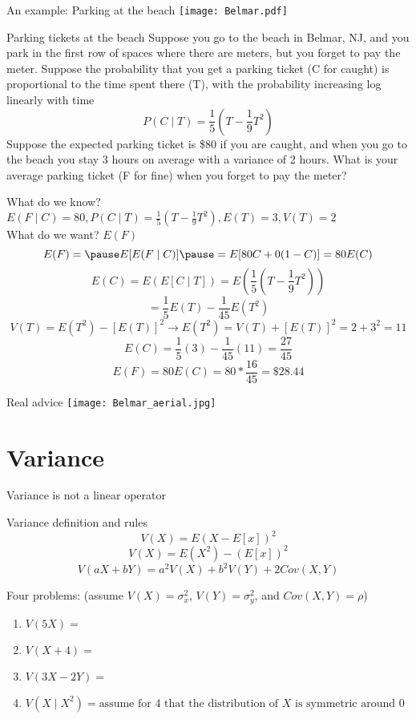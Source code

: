 \documentclass{beamer}
\begin{document}
\begin{frame}{An example: Parking at the beach}
\centering\texttt{[image: Belmar.pdf]}
\end{frame}

\begin{frame}{Parking tickets at the beach}
Suppose you go to the beach in Belmar, NJ, and you park in the first row of spaces where there are meters, but you forget to pay the meter. Suppose the probability that you get a parking ticket (C for caught) is proportional to the time spent there (T), with the probability increasing log linearly with time
$$P(C \mid T) = \frac{1}{5}\left(T-\frac{1}{9}T^2\right)$$
Suppose the expected parking ticket is \$80 if you are caught, and when you go to the beach you stay 3 hours on average with a variance of 2 hours. What is your average parking ticket (F for fine) when you forget to pay the meter?
\end{frame}

\begin{frame}
\alert{What do we know?} $E(F\mid C)=80, P(C\mid T)=\frac{1}{5}\left(T-\frac{1}{9}T^2\right), E(T)=3, V(T)=2$ \\
\alert{What do we want?} $E(F)$ \\
$$E(F) = \pause E[E(F\mid C)] \pause = E[80C + 0(1-C)] = 80E(C)$$
\pause
$$E(C)=E(E[C\mid T])=E\left(\frac{1}{5}\left (T-\frac{1}{9}T^2\right)\right)$$
\pause
$$=\frac{1}{5}E(T)-\frac{1}{45}E(T^2)$$
\pause
$$V(T)=E(T^2)-[E(T)]^2 \rightarrow E(T^2)=V(T)+[E(T)]^2=2+3^2=11$$
\pause
$$E(C)=\frac{1}{5}(3)-\frac{1}{45}(11)=\frac{27}{45}$$
\pause
$$E(F)=80E(C)=80*\frac{16}{45}=\$28.44$$
\end{frame}

\begin{frame}{Real advice}
\centering\texttt{[image: Belmar\_aerial.jpg]}
\end{frame}

\section{Variance}
\begin{frame}{Variance is not a linear operator}
\begin{block}{Variance definition and rules}
$$V(X)=E(X-E[x])^2$$
$$V(X)=E(X^2)-(E[x])^2$$
$$V(aX+bY)=a^2V(X)+b^2V(Y)+2Cov(X,Y)$$
\end{block}
\begin{small}
Four problems: (assume $V(X)=\sigma^2_x$, $V(Y)=\sigma^2_y$, and $Cov(X,Y)=\rho$)
\begin{enumerate}
\item $V(5X) =$
\item $V(X+4) =$ 
\item $V(3X-2Y) = $
\item $V(X\mid X^2) = \text{assume for 4 that the distribution of }X\text{ is symmetric around 0}$
\end{enumerate}
\end{small}
\end{frame}
\end{document}
